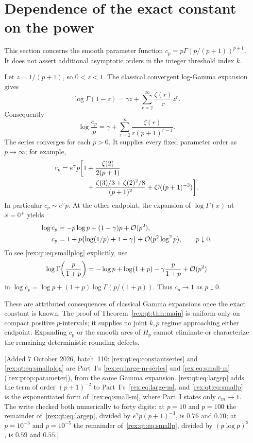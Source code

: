 \section{Dependence of the exact constant on the power}\label{rex:qt:sec:parameter}
This section concerns the smooth parameter function $c_p=p\Gamma(p/(p+1))^{p+1}$. It does not assert additional asymptotic orders in the integer threshold index $k$.

Let $z=1/(p+1)$, so $0<z<1$. The classical convergent log-Gamma expansion \cite[Equation~5.7.3]{dlmf} gives
\[
 \log\Gamma(1-z)=\gamma z+\sum_{r=2}^{\infty}\frac{\zeta(r)}r z^r.
\]
Consequently
\begin{equation}\label{rex:qt:eq:constantseries}
 \log\frac{c_p}{p}
 =\gamma+\sum_{r=2}^{\infty}\frac{\zeta(r)}{r(p+1)^{r-1}}.
\end{equation}
The series converges for each $p>0$. It supplies every fixed parameter order as $p\to\infty$; for example,
\begin{align}
 c_p=e^\gamma p\bigg[1&+\frac{\zeta(2)}{2(p+1)}\notag\\
 &+\frac{\zeta(3)/3+\zeta(2)^2/8}{(p+1)^2}
       +\mathcal O((p+1)^{-3})\bigg].\label{rex:qt:eq:largep}
\end{align}
In particular $c_p\sim e^\gamma p$. At the other endpoint, the expansion of $\log\Gamma(x)$ at $x=0^+$ yields
\begin{align}
 \log c_p&=-p\log p+(1-\gamma)p+\mathcal O(p^2),\label{rex:qt:eq:smallplog}\\
 c_p&=1+p\bigl(\log(1/p)+1-\gamma\bigr)
             +\mathcal O(p^2\log^2 p),\qquad p\downarrow0.\label{rex:qt:eq:smallp}
\end{align}
To see \eqref{rex:qt:eq:smallplog} explicitly, use
\[
 \log\Gamma\!\left(\frac p{1+p}\right)
 =-\log p+\log(1+p)-\gamma\frac p{1+p}+\mathcal O(p^2)
\]
in $\log c_p=\log p+(1+p)\log\Gamma(p/(1+p))$. Thus $c_p\to1$ as $p\downarrow0$.

These are attributed consequences of classical Gamma expansions once the exact constant is known. The proof of Theorem~\ref{rex:qt:thm:main} is uniform only on compact positive $p$-intervals; it supplies no joint $k,p$ regime approaching either endpoint. Expanding $c_p$ or the smooth arcs of $H_p$ cannot eliminate or characterize the remaining deterministic rounding defects.

[Added 7 October 2026, batch~110: \eqref{rex:qt:eq:constantseries} and
\eqref{rex:qt:eq:smallplog} are Part~I's \eqref{rex:eq:large-m-series} and
\eqref{rex:eq:small-m} (\cref{rex:prop:parameter}), from the same Gamma
expansion. \eqref{rex:qt:eq:largep} adds the term of order $(p+1)^{-2}$ to
Part~I's~\eqref{rex:eq:large-m}, and \eqref{rex:qt:eq:smallp} is the
exponentiated form of~\eqref{rex:eq:small-m}, where Part~I states only
$c_m\to1$. The write checked both numerically to forty digits: at
$p=10$ and $p=100$ the remainder of~\eqref{rex:qt:eq:largep}, divided by
$e^\gamma p(p+1)^{-3}$, is $0.76$ and $0.70$; at $p=10^{-3}$ and
$p=10^{-5}$ the remainder of~\eqref{rex:qt:eq:smallp}, divided by
$(p\log p)^2$, is $0.59$ and $0.55$.]

